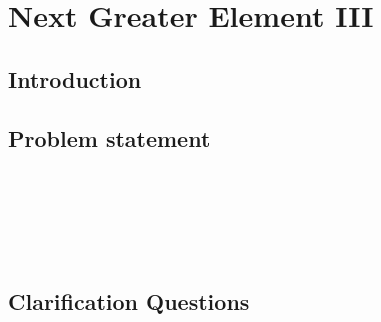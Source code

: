 %



\chapter{Next Greater Element \RN{3}}
\label{ch:next_greater_element_3}
\section*{Introduction}

\section{Problem statement}
\begin{exercise}
\label{example:next_greater_element_3:exercice1}

	\begin{example}
		\label{example:next_greater_element_3:example1}
		\hfill \
	}
		
	\end{example}

	\begin{example}
		\label{example:next_greater_element_3:example2}
		\hfill \
		
	\end{example}

	\begin{example}
		\hfill \
	
	\label{ex:next_greater_element_3:example3}
	\end{example}

	\begin{example}
		\hfill \

	\label{ex:next_greater_element_3:example4}	
	\end{example}
\end{exercise}

\section{Clarification Questions}

